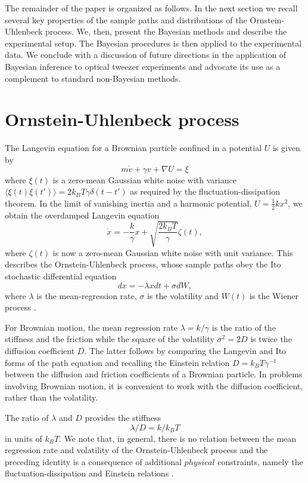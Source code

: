 \documentclass[fleqn,10pt]{wlscirep}
\begin{document}
The remainder of the paper is organized as follows. In the next section
we recall several key properties of the sample paths and distributions
of the Ornstein-Uhlenbeck process. We, then, present the Bayesian
methods and describe the experimental setup. The Bayesian procedures
is then applied to the experimental data. We conclude with a discussion
of future directions in the application of Bayesian inference to optical
tweezer experiments and advocate its use as a complement to standard
non-Bayesian methods.
\section*{Ornstein-Uhlenbeck process}
The
Langevin equation for a Brownian particle confined in a potential
$U$ is given by
\begin{equation}
m\dot{v}+\gamma v+\nabla U=\xi
\end{equation}
where $\xi(t)$ is a zero-mean Gaussian white noise with variance
$\langle\xi(t)\xi(t')\rangle=2k_{B}T\gamma\delta(t-t')$ as required
by the fluctuation-dissipation theorem. In the limit of vanishing
inertia and a harmonic potential, $U=\frac{{1}}{2}kx^{2}$, we obtain
the overdamped Langevin equation
\begin{equation}
\dot{x}=-\frac{k}{\gamma}x+\sqrt{\frac{2k_{B}T}{\gamma}}\zeta(t),
\end{equation}
where $\zeta(t)$ is now a zero-mean Gaussian white noise with unit
variance. This describes the Ornstein-Uhlenbeck process, whose sample
paths obey the Ito stochastic differential equation 
\begin{equation}
dx=-\lambda xdt+\sigma dW,
\end{equation}
where $\lambda$ is the mean-regression rate, $\sigma$ is the volatility
and $W(t)$ is the Wiener process \cite{gardiner1985handbook}. 

For Brownian motion, the mean regression rate $\lambda=k/\gamma$
is the ratio of the stiffness and the friction while the square of
the volatility $\sigma^{2}=2D$ is twice the diffusion coefficient
$D$. The latter follows by comparing the Langevin and Ito forms of
the path equation and recalling the Einstein relation $D=k_{B}T\gamma^{-1}$
between the diffusion and friction coefficients of a Brownian particle.
In problems involving Brownian motion, it is convenient to work with
the diffusion coefficient, rather than the volatility. 

The ratio of $\lambda$ and $D$ provides the stiffness
\begin{equation}
\lambda/D=k/k_{B}T
\end{equation}
in units of $k_{B}T$. We note that, in general, there is no relation
between the mean regression rate and volatility of the Ornstein-Uhlenbeck
process and the preceding identity is a consequence of additional
$physical$ constraints, namely the fluctuation-dissipation and Einstein
relations \cite{kubo1966fluctuation}. 
\end{document}
